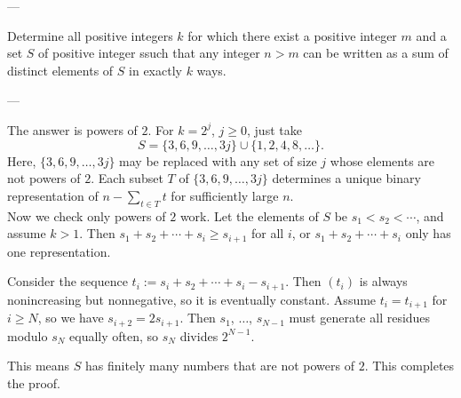 
---

Determine all positive integers $k$ for which there exist a positive integer $m$ and a set $S$ of positive integer ssuch that any integer $n>m$ can be written as a sum of distinct elements of $S$ in exactly $k$ ways.

---

The answer is powers of $2$. For $k=2^j$, $j\ge0$, just take \[S=\{3,6,9,\ldots,3j\}\cup\{1,2,4,8,\ldots\}.\]
Here, $\{3,6,9,\ldots,3j\}$ may be replaced with any set of size $j$ whose elements are not powers of $2$. Each subset $T$ of $\{3,6,9,\ldots,3j\}$ determines a unique binary representation of $\textstyle n-\sum_{t\in T}t$ for sufficiently large $n$.\\

Now we check only powers of $2$ work. Let the elements of $S$ be $s_1<s_2<\cdots$, and assume $k>1$. Then $s_1+s_2+\cdots+s_i\ge s_{i+1}$ for all $i$, or $s_1+s_2+\cdots+s_i$ only has one representation.

Consider the sequence $t_i:=s_i+s_2+\cdots+s_i-s_{i+1}$. Then $(t_i)$ is always nonincreasing but nonnegative, so it is eventually constant. Assume $t_i=t_{i+1}$ for $i\ge N$, so we have $s_{i+2}=2s_{i+1}$. Then $s_1$, $\ldots$, $s_{N-1}$ must generate all residues modulo $s_N$ equally often, so $s_N$ divides $2^{N-1}$.

This means $S$ has finitely many numbers that are not powers of $2$. This completes the proof.

